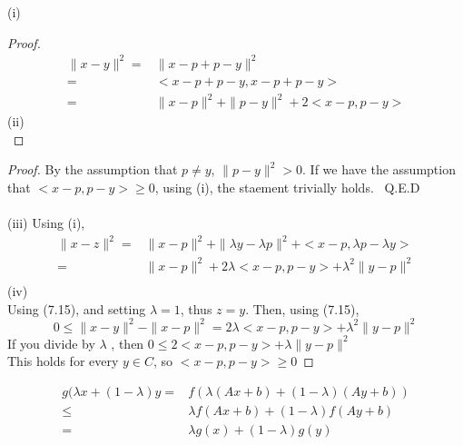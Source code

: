 \documentclass[12pt]{article}
\newenvironment{problem}[2][Problem]{\begin{trivlist}
\item[\hskip \labelsep {\bfseries #1}\hskip \labelsep {\bfseries #2.}]}{\end{trivlist}}
\begin{document}
\begin{problem}{7.4}
(i) \\

\begin{proof}
\begin{align*}
  \|x-y\|^2 =&  \|x-p + p-y\|^2 \\
            =& <x-p + p -y, x-p + p-y> \\
            =& \|x-p\|^2 + \|p-y\|^2 + 2<x-p,p-y>
\end{align*}
(ii) \\
\end{proof}
\begin{proof}
By the assumption that $p \neq y$, $\| p-y \|^2 > 0$. If we have the assumption that $<x-p,p-y> \geq 0$, using (i),
the staement trivially holds. \ Q.E.D \\\\
(iii) Using (i),
\begin{align*}
  \|x-z\|^2=& \|x-p\|^2 + \| \lambda y - \lambda p \|^2 + <x-p, \lambda p - \lambda y> \\
  =& \|x-p\|^2 + 2 \lambda <x-p, p-y> + \lambda^2 \| y-p \|^2 \\
\end{align*}
(iv) \\
Using (7.15), and setting $\lambda = 1$, thus $z=y$. Then, using (7.15),
\[0 \leq \|x-y\|^2 - \| x-p \|^2 = 2 \lambda <x-p, p-y> + \lambda^2 \| y-p \|^2 \]
If you divide by $\lambda$ , then $ 0 \leq 2 <x-p,p-y> + \lambda \| y-p \|^2 $ \\
This holds for every $y \in C$, so $<x-p,p-y> \geq 0 $
\end{proof}
\end{problem}

\begin{problem}{7.8}
\begin{align*}
 g(\lambda x + (1 - \lambda) y  =&  f(\lambda(Ax + b) + (1- \lambda)(Ay + b) ) \\
   \leq & \lambda f(Ax + b) + (1-\lambda) f(Ay + b) \\
   =& \lambda g(x) + (1-\lambda) g(y) \\
\end{align*}
\end{problem}
\end{document}

